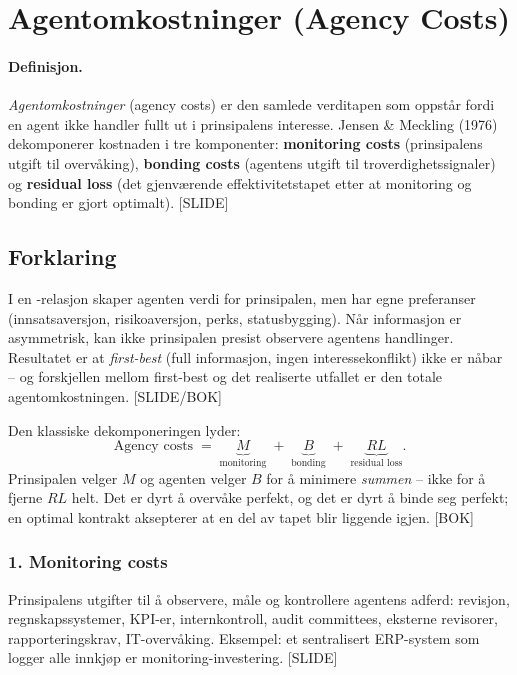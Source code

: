 \section{Agentomkostninger (Agency Costs)}\label{thr:agency-costs}

\paragraph{Definisjon.} \emph{Agentomkostninger} (agency costs) er den samlede verditapen som oppstår fordi en agent ikke handler fullt ut i prinsipalens interesse. Jensen \& Meckling (1976) dekomponerer kostnaden i tre komponenter: \textbf{monitoring costs} (prinsipalens utgift til overvåking), \textbf{bonding costs} (agentens utgift til troverdighetssignaler) og \textbf{residual loss} (det gjenværende effektivitetstapet etter at monitoring og bonding er gjort optimalt). [SLIDE]

\subsection*{Forklaring}

I en -relasjon skaper agenten verdi for prinsipalen, men har egne preferanser (innsatsaversjon, risikoaversjon, perks, statusbygging). Når informasjon er asymmetrisk, kan ikke prinsipalen presist observere agentens handlinger. Resultatet er at \emph{first-best} (full informasjon, ingen interessekonflikt) ikke er nåbar -- og forskjellen mellom first-best og det realiserte utfallet er den totale agentomkostningen. [SLIDE/BOK]

Den klassiske dekomponeringen lyder:
\[
  \text{Agency costs} \;=\; \underbrace{M}_{\text{monitoring}} \;+\; \underbrace{B}_{\text{bonding}} \;+\; \underbrace{RL}_{\text{residual loss}}.
\]
Prinsipalen velger $M$ og agenten velger $B$ for å minimere \emph{summen} -- ikke for å fjerne $RL$ helt. Det er dyrt å overvåke perfekt, og det er dyrt å binde seg perfekt; en optimal kontrakt aksepterer at en del av tapet blir liggende igjen. [BOK]

\subsubsection*{1. Monitoring costs}
Prinsipalens utgifter til å observere, måle og kontrollere agentens adferd: revisjon, regnskapssystemer, KPI-er, internkontroll, audit committees, eksterne revisorer, rapporteringskrav, IT-overvåking. Eksempel: et sentralisert ERP-system som logger alle innkjøp er monitoring-investering. [SLIDE]

